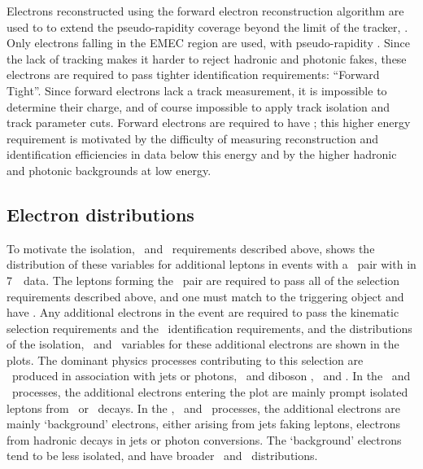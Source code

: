 Electrons reconstructed using the forward electron reconstruction algorithm are
used to to extend the pseudo-rapidity coverage beyond the limit of the tracker,
. Only electrons falling in the EMEC region are used, with
pseudo-rapidity .  Since the lack of tracking makes it
harder to reject hadronic and photonic fakes, these electrons are required to
pass tighter identification requirements: ``Forward Tight''. Since forward
electrons lack a track measurement, it is impossible to determine their charge,
and of course impossible to apply track isolation and track parameter cuts.
Forward electrons are required to have ; this higher energy requirement
is motivated by the difficulty of measuring reconstruction and identification
efficiencies in data below this energy and by the higher hadronic and photonic
backgrounds at low energy.

\subsection{Electron distributions}

To motivate the isolation, \dzerosig\ and \zzero\ requirements described
above,  shows the distribution of these variables for additional
leptons in events with a \dilepton\ pair with \sstooos in 7~\tev\ data. 
The leptons forming the \dilepton\ pair are required to pass all of
the selection requirements described above, and one must match to the triggering
object and have . Any additional electrons in the event are required to pass
the kinematic selection requirements and the \loosePP\ identification
requirements, and the distributions of the isolation, \dzerosig\ and \zzero\
variables for these additional electrons are shown in the plots. The dominant
physics processes contributing to this selection are \Zll\ produced in
association with jets or photons, \ttbar\ and diboson \WW, \WZ\ and \ZZ. In the
\WZ\ and \ZZ\ processes, the additional electrons entering the plot are mainly
prompt isolated leptons from \W\ or \Z\ decays. In the \Zll, \ttbar\ and \WW\
processes, the additional electrons are mainly `background' electrons, either
arising from jets faking leptons, electrons from hadronic decays in jets or
photon conversions. The `background' electrons tend to be less isolated, and
have broader \dzerosig\ and \zzero\ distributions.

